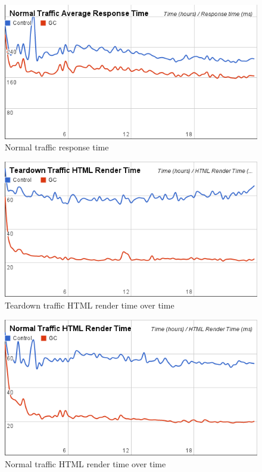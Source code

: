 \documentclass[12pt]{ucthesis}
\begin{document}
\begin{figure}[htp]
\centering
\includegraphics[width=\textwidth]{assets/normalRespTimeXTime.png}
\caption{Normal traffic response time}
\label{fig:normalRespTimeXTime}
\end{figure}


\begin{figure}[htp]
\centering
\includegraphics[width=\textwidth]{assets/teardownHTMLRenderTimeXTime.png}
\caption{Teardown traffic HTML render time over time}
\label{fig:teardownHTMLRenderTimeXTime}
\end{figure}

\begin{figure}[htp]
\centering
\includegraphics[width=\textwidth]{assets/normalHTMLRenderTimeXTime.png}
\caption{Normal traffic HTML render time over time}
\label{fig:normalHTMLRenderTimeXTime}
\end{figure}
\end{document}
